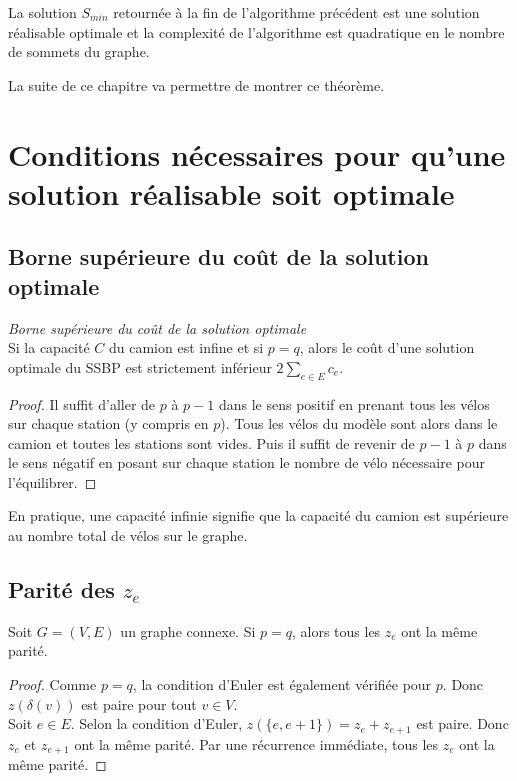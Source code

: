 \begin{thm}
La solution $S_{min}$ retournée à la fin de l'algorithme précédent est une solution réalisable optimale et la complexité de l'algorithme est quadratique en le nombre de sommets du graphe.
\end{thm}

La suite de ce chapitre va permettre de montrer ce théorème.

\section{Conditions nécessaires pour qu'une solution réalisable soit optimale}

\subsection{Borne supérieure du coût de la solution optimale}

\begin{lem}\label{capacite infinie - borne sup cout}
\emph{Borne supérieure du coût de la solution optimale}\\
Si la capacité $C$ du camion est infine et si $p=q$, alors le coût d'une solution optimale du SSBP est strictement inférieur $\displaystyle 2\sum_{e \in E}c_e$.
\end{lem}

\begin{proof}
Il suffit d'aller de $p$ à $p-1$ dans le sens positif en prenant tous les vélos sur chaque station (y compris en $p$). Tous les vélos du modèle sont alors dans le camion et toutes les stations sont vides. Puis il suffit de revenir de $p-1$ à $p$ dans le sens négatif en posant sur chaque station le nombre de vélo nécessaire pour l'équilibrer.
\end{proof}

En pratique, une capacité infinie signifie que la capacité du camion est supérieure au nombre total de vélos sur le graphe.

\subsection{Parité des $z_e$}

\begin{prop}\label{parité des Ze}
Soit $G=(V,E)$ un graphe connexe. Si $p=q$, alors tous les $z_e$ ont la même parité.
\end{prop}

\begin{proof}
Comme $p=q$, la condition d'Euler est également vérifiée pour $p$. Donc $z(\delta(v))$ est paire pour tout $v \in V$.\\
Soit $e \in E$. Selon la condition d'Euler, $z(\{e, e+1\}) = z_e + z_{e+1}$ est paire. Donc $z_e$ et $z_{e+1}$ ont la même parité. Par une récurrence immédiate, tous les $z_e$ ont la même parité.
\end{proof}

